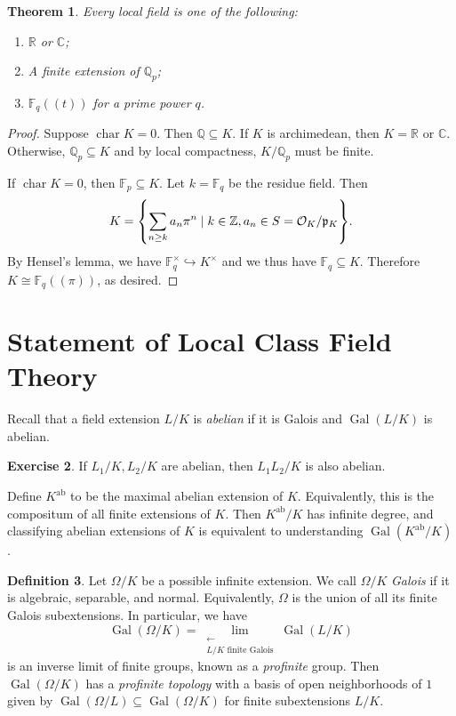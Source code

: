 \documentclass[leqno, openany]{memoir}
\newtheorem{thm}{Theorem}[section]
\theoremstyle{definition}
\newtheorem{defn}[thm]{Definition}
\newtheorem{exer}[thm]{Exercise}
\theoremstyle{remark}
\theoremstyle{plain}
\theoremstyle{definition}
\theoremstyle{remark}
\newcommand{\R}{\mathbb{R}}
\newcommand{\F}{\mathbb{F}}
\newcommand{\C}{\mathbb{C}}
\newcommand{\Z}{\mathbb{Z}}
\newcommand{\Q}{\mathbb{Q}}
\newcommand{\mc}[1]{\mathcal{#1}}
\newcommand{\mf}[1]{\mathfrak{#1}}
\newcommand{\mr}[1]{\mathrm{#1}}
\DeclareMathOperator{\Gal}{Gal}
\begin{document}
\begin{thm}
    Every local field is one of the following:
    \begin{enumerate}
        \item $\R$ or $\C$;
        \item A finite extension of $\Q_p$;
        \item $\F_q((t))$ for a prime power $q$.
    \end{enumerate}
\end{thm}

\begin{proof}
    Suppose $\operatorname{char} K = 0$. Then $\Q \subseteq K$. If $K$ is archimedean, then $K = \R$ or $\C$. Otherwise, $\Q_p \subseteq K$ and by local compactness, $K/\Q_p$ must be finite.

    If $\operatorname{char} K = 0$, then $\F_p \subseteq K$. Let $k = \F_q$ be the residue field. Then 
    \[ K = \qty{\sum_{n \geq k} a_n \pi^n \mid k \in \Z, a_n \in S = \mc{O}_K / \mf{p}_K}. \]
    By Hensel's lemma, we have $\F_q^{\times} \hookrightarrow K^{\times}$ and we thus have $\F_q \subseteq K$. Therefore $K \cong \F_q((\pi))$, as desired.
\end{proof}

\section{Statement of Local Class Field Theory}%
\label{cha:local_class_field_theory}

Recall that a field extension $L/K$ is \textit{abelian} if it is Galois and $\Gal(L/K)$ is abelian.

\begin{exer}
    If $L_1/K, L_2/K$ are abelian, then $L_1 L_2 / K$ is also abelian.
\end{exer}

Define $K^{\mr{ab}}$ to be the maximal abelian extension of $K$. Equivalently, this is the compositum of all finite extensions of $K$. Then $K^{\mr{ab}}/K$ has infinite degree, and classifying abelian extensions of $K$ is equivalent to understanding $\Gal(K^{\mr{ab}}/K)$.

\begin{defn}
    Let $\Omega /K$ be a possible infinite extension. We call $\Omega/K$ \textit{Galois} if it is algebraic, separable, and normal. Equivalently, $\Omega$ is the union of all its finite Galois subextensions. In particular, we have
    \[ \Gal(\Omega/K) = \lim_{\substack{\longleftarrow \\ L/K \text{ finite Galois}}} \Gal(L/K) \]
    is an inverse limit of finite groups, known as a \textit{profinite} group. Then $\Gal(\Omega / K)$ has a \textit{profinite topology} with a basis of open neighborhoods of $1$ given by $\Gal(\Omega / L) \subseteq \Gal(\Omega / K)$ for finite subextensions $L/K$.  
\end{defn}
\end{document}
